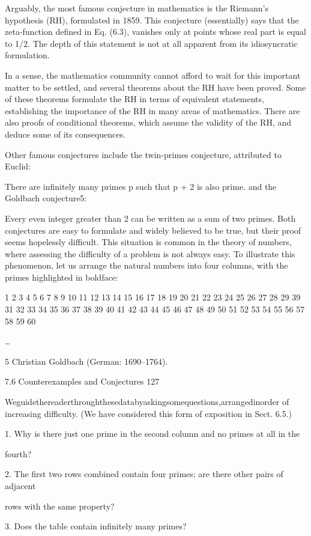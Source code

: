 \documentclass[11pt]{article}
\theoremstyle{plain}
\theoremstyle{definition}
\begin{document}
Arguably, the most famous conjecture in mathematics is the Riemann's hypothesis (RH), formulated in 1859. This conjecture (essentially) says that the zeta-function defined in Eq. (6.3), vanishes only at points whose real part is equal to 1/2. The depth of this statement is not at all apparent from its idiosyncratic formulation.

In a sense, the mathematics community cannot afford to wait for this important matter to be settled, and several theorems about the RH have been proved. Some of these theorems formulate the RH in terms of equivalent statements, establishing the importance of the RH in many areas of mathematics. There are also proofs of conditional theorems, which assume the validity of the RH, and deduce some of its consequences.

Other famous conjectures include the twin-primes conjecture, attributed to Euclid:

There are infinitely many primes p such that p + 2 is also prime. and the Goldbach conjecture5:

Every even integer greater than 2 can be written as a sum of two primes. Both conjectures are easy to formulate and widely believed to be true, but their proof seems hopelessly difficult. This situation is common in the theory of numbers, where assessing the difficulty of a problem is not always easy. To illustrate this phenomenon, let us arrange the natural numbers into four columns, with the primes highlighted in boldface:

1 2 3 4 5 6 7 8 9 10 11 12 13 14 15 16 17 18 19 20 21 22 23 24 25 26 27 28 29 39 31 32 33 34 35 36 37 38 39 40 41 42 43 44 45 46 47 48 49 50 51 52 53 54 55 56 57 58 59 60

\dots{}

5 Christian Goldbach (German: 1690--1764).

7.6 Counterexamples and Conjectures 127

Weguidethereaderthroughthesedatabyaskingsomequestions,arrangedinorder of increasing difficulty. (We have considered this form of exposition in Sect. 6.5.)

1. Why is there just one prime in the second column and no primes at all in the

fourth?

2. The first two rows combined contain four primes; are there other pairs of adjacent

rows with the same property?

3. Does the table contain infinitely many primes?
\end{document}
